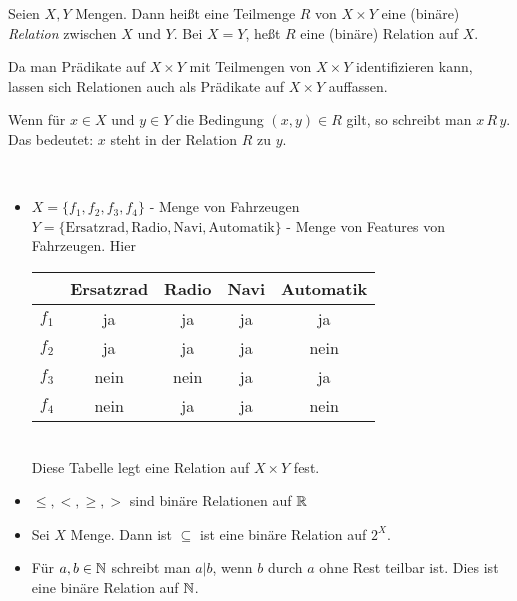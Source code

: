 \begin{defn}
Seien $ X,Y $ Mengen. Dann heißt eine Teilmenge $ R $ von $ X \times Y $ eine (binäre) \emph{Relation} zwischen $ X $ und $ Y $. Bei $X = Y$, heßt $R$ eine (binäre) Relation auf $X$. 
\end{defn}

\begin{bem}
	Da man Prädikate auf $X \times Y$ mit Teilmengen von $X \times Y$ identifizieren kann, lassen sich Relationen auch als Prädikate auf $X \times Y$ auffassen. 
\end{bem} 

\begin{bem}
Wenn für $ x \in X $ und $ y \in Y $ die Bedingung $ (x,y) \in R $ gilt, so schreibt man $ x \, R \, y $. Das bedeutet: $x$ steht in der Relation $R$ zu $y$. 
\end{bem}

\begin{bsp}\ %
\begin{itemize}
	\item $ X = \{f_1,f_2,f_3,f_4\} $ - Menge von Fahrzeugen\\
	$ Y =  \{ \text{Ersatzrad}, \text{Radio}, \text{Navi}, \text{Automatik} \}$ - Menge von Features von Fahrzeugen. Hier 

	\begin{tabular}{l|c|c|c|c}
		& Ersatzrad & Radio & Navi & Automatik \\
		\hline
		$ f_1 $ & ja & ja & ja & ja \\
		$ f_2 $ & ja & ja & ja & nein \\
		$ f_3 $ & nein & nein & ja & ja \\
		$ f_4 $ & nein & ja & ja & nein
	\end{tabular} \\ 
	Diese Tabelle legt eine Relation auf $X \times Y$ fest. 
	\item $ \leq, <, \geq, > $ sind binäre Relationen auf $ \mathbb{R}$
	\item Sei $X$ Menge. Dann ist $ \subseteq $ ist eine binäre Relation auf $ 2^X $.
	\item Für $ a,b \in \mathbb{N} $ schreibt man $ a | b $, wenn $ b $ durch $ a $ ohne Rest teilbar ist. Dies ist eine binäre Relation auf $\mathbb{N}$. 
\end{itemize}
\end{bsp}


